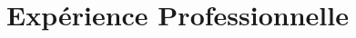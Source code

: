 \documentclass[letterpaper]{twentysecondcv} %
\begin{document}
\makeprofile %



%

\section{Expérience Professionnelle}
\end{document}
